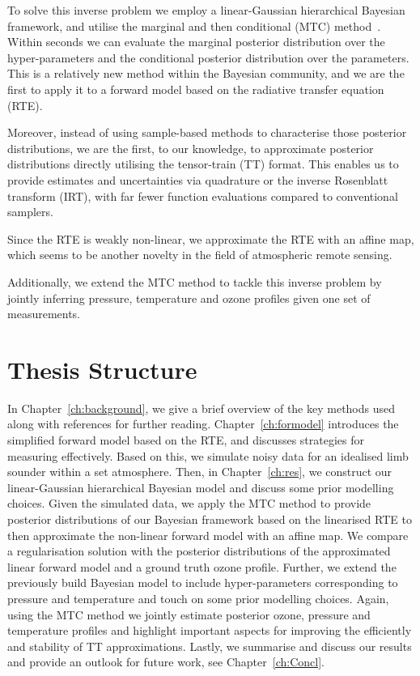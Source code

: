 To solve this inverse problem we employ a linear-Gaussian hierarchical Bayesian framework, and utilise the marginal and then conditional (MTC) method~\cite{fox2016fast}.
Within seconds we can evaluate the marginal posterior distribution over the hyper-parameters and the conditional posterior distribution over the parameters.
This is a relatively new method within the Bayesian community, and we are the first to apply it to a forward model based on the radiative transfer equation (RTE).

Moreover, instead of using sample-based methods to characterise those posterior distributions, we are the first, to our knowledge, to approximate posterior distributions directly utilising the tensor-train (TT) format.
This enables us to provide estimates and uncertainties via quadrature or the inverse Rosenblatt transform (IRT), with far fewer function evaluations compared to conventional samplers.

Since the RTE is weakly non-linear, we approximate the RTE with an affine map, which seems to be another novelty in the field of atmospheric remote sensing.

Additionally, we extend the MTC method to tackle this inverse problem by jointly inferring pressure, temperature and ozone profiles given one set of measurements.


\section{Thesis Structure}
In Chapter~\ref{ch:background}, we give a brief overview of the key methods used along with references for further reading.
Chapter~\ref{ch:formodel} introduces the simplified forward model based on the RTE, and discusses strategies for measuring effectively.
Based on this, we simulate noisy data for an idealised limb sounder within a set atmosphere.
Then, in Chapter~\ref{ch:res}, we construct our linear-Gaussian hierarchical Bayesian model and discuss some prior modelling choices.
Given the simulated data, we apply the MTC method to provide posterior distributions of our Bayesian framework based on the linearised RTE to then approximate the non-linear forward model with an affine map. 
We compare a regularisation solution with the posterior distributions of the approximated linear forward model and a ground truth ozone profile.
Further, we extend the previously build Bayesian model to include hyper-parameters corresponding to pressure and temperature and touch on some prior modelling choices. 
Again, using the MTC method we jointly estimate posterior ozone, pressure and temperature profiles and highlight important aspects for improving the efficiently and stability of TT approximations.
Lastly, we summarise and discuss our results and provide an outlook for future work, see Chapter~\ref{ch:Concl}.

